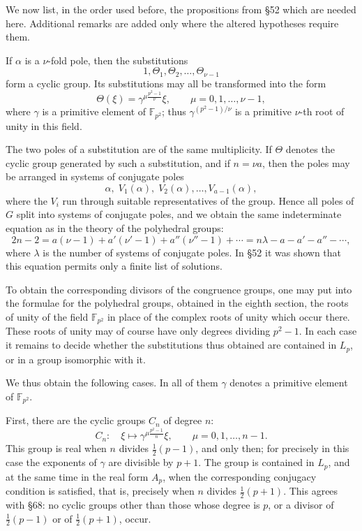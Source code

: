 \documentclass[11pt,a4paper]{book}
\newcommand{\F}{\mathbb F}
\begin{document}
We now list, in the order used before, the propositions from \S 52 which are needed here.  Additional remarks are added only where the altered hypotheses require them.

If \(\alpha\) is a \(\nu\)-fold pole, then the substitutions
\[
 1,\Theta_1,\Theta_2,\ldots,\Theta_{\nu-1}
\]
form a cyclic group.  Its substitutions may all be transformed into the form
\[
 \Theta(\xi)=\gamma^{\mu\frac{p^2-1}{\nu}}\xi,\qquad
 \mu=0,1,\ldots,\nu-1,
\]
where \(\gamma\) is a primitive element of \(\F_{p^2}\); thus
\(\gamma^{(p^2-1)/\nu}\) is a primitive \(\nu\)-th root of unity in this field.

The two poles of a substitution are of the same multiplicity.  If \(\Theta\) denotes the cyclic group generated by such a substitution, and if \(n=\nu a\), then the poles may be arranged in systems of conjugate poles
\[
 \alpha,\;V_1(\alpha),\;V_2(\alpha),\ldots,V_{a-1}(\alpha),
\]
where the \(V_i\) run through suitable representatives of the group.  Hence all poles of \(G\) split into systems of conjugate poles, and we obtain the same indeterminate equation as in the theory of the polyhedral groups:
\[
 2n-2=a(\nu-1)+a'(\nu'-1)+a''(\nu''-1)+\cdots
      =n\lambda-a-a'-a''-\cdots ,
\]
where \(\lambda\) is the number of systems of conjugate poles.  In \S 52 it was shown that this equation permits only a finite list of solutions.

To obtain the corresponding divisors of the congruence groups, one may put into the formulae for the polyhedral groups, obtained in the eighth section, the roots of unity of the field \(\F_{p^2}\) in place of the complex roots of unity which occur there.  These roots of unity may of course have only degrees dividing \(p^2-1\).  In each case it remains to decide whether the substitutions thus obtained are contained in \(L_p\), or in a group isomorphic with it.

We thus obtain the following cases.  In all of them \(\gamma\) denotes a primitive element of \(\F_{p^2}\).

First, there are the cyclic groups \(C_n\) of degree \(n\):
\[
 C_n:\quad
 \xi\longmapsto \gamma^{\mu\frac{p^2-1}{n}}\xi,\qquad
 \mu=0,1,\ldots,n-1 .
\]
This group is real when \(n\) divides \(\frac12(p-1)\), and only then; for precisely in this case the exponents of \(\gamma\) are divisible by \(p+1\).  The group is contained in \(L_p\), and at the same time in the real form \(A_p\), when the corresponding conjugacy condition is satisfied, that is, precisely when \(n\) divides \(\frac12(p+1)\).  This agrees with \S 68: no cyclic groups other than those whose degree is \(p\), or a divisor of \(\frac12(p-1)\) or of \(\frac12(p+1)\), occur.
\end{document}
